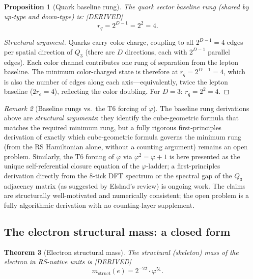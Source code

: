 \documentclass[11pt,a4paper]{article}
\newtheorem{theorem}{Theorem}[section]
\newtheorem{proposition}[theorem]{Proposition}
\theoremstyle{definition}
\theoremstyle{remark}
\newtheorem{remark}[theorem]{Remark}
\newcommand{\phig}{\varphi}
\newcommand{\DERIVED}{\textcolor{blue!70!black}{\footnotesize\textsf{[DERIVED]}}}
\begin{document}
\begin{proposition}[Quark baseline rung]
\label{prop:r_q}
The quark sector baseline rung (shared by up-type and down-type) is:
\DERIVED{}
\begin{equation}
  \boxed{r_q = 2^{D-1} = 2^2 = 4.}
  \label{eq:r_q}
\end{equation}
\end{proposition}

\begin{proof}[Structural argument]
Quarks carry color charge, coupling to all $2^{D-1} = 4$ edges per
spatial direction of $Q_3$ (there are $D$ directions, each with $2^{D-1}$
parallel edges).  Each color channel contributes one rung of separation
from the lepton baseline.  The minimum color-charged state is therefore at
$r_q = 2^{D-1} = 4$, which is also the number of edges along each
axis---equivalently, twice the lepton baseline ($2 r_e = 4$), reflecting
the color doubling.  For $D = 3$: $r_q = 2^2 = 4$.
\end{proof}

\begin{remark}[Baseline rungs vs.\ the T6 forcing of $\phig$]
\label{rem:baseline_status}
The baseline rung derivations above are \emph{structural arguments}:
they identify the cube-geometric formula that matches the required minimum
rung, but a fully rigorous first-principles derivation of exactly which
cube-geometric formula governs the minimum rung (from the RS Hamiltonian
alone, without a counting argument) remains an open problem.  Similarly,
the T6 forcing of $\phig$ via $\phig^2 = \phig + 1$ is here presented
as the unique self-referential closure equation of the $\phig$-ladder;
a first-principles derivation directly from the 8-tick DFT spectrum or
the spectral gap of the $Q_3$ adjacency matrix (as suggested by Elshad's
review) is ongoing work.  The claims are structurally well-motivated and
numerically consistent; the open problem is a fully algorithmic derivation
with no counting-layer supplement.
\end{remark}

\subsection{The electron structural mass: a closed form}

\begin{theorem}[Electron structural mass]
\label{thm:m_e_structural}
The structural (skeleton) mass of the electron in RS-native units is \DERIVED{}
\begin{equation}
  \boxed{m_{\mathrm{struct}}(e) = 2^{-22} \cdot \phig^{51}.}
  \label{eq:m_e_structural}
\end{equation}
\end{theorem}
\end{document}
